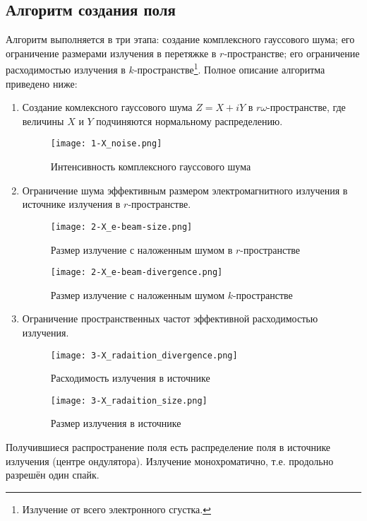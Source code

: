 \subsection{Алгоритм создания поля}
Алгоритм выполняется в три этапа: создание комплексного гауссового шума; его ограничение размерами излучения в перетяжке в $r$-пространстве; его ограничение расходимостью излучения в $k$-пространстве\footnote{Излучение от всего электронного сгустка.}. Полное описание алгоритма приведено ниже: 
\begin{enumerate}
\item \label{noise} Создание комлексного гауссового шума $Z = X + iY$ в $r\omega$-пространстве, где величины $X$ и $Y$ подчиняются нормальному распределению.
\begin{figure}[H] 
	\centering 	\texttt{[image: 1-X\_noise.png]}
	\caption{Интенсивность комплексного гауссового шума}
	\label{fig:1-noise}
\end{figure}
\item \label{beam_s} Ограничение шума эффективным размером электромагнитного излучения в источнике излучения в \textit{$r$}-пространстве.
\begin{figure}[H]
	\centering
	\begin{minipage}{0.45\textwidth}
		\centering
		\texttt{[image: 2-X\_e-beam-size.png]}
		\caption{Размер излучение с наложенным шумом в $r$-пространстве}
		\label{fig:2-beam_size_k}
	\end{minipage}
	\begin{minipage}{0.45\textwidth}
		\centering
		\texttt{[image: 2-X\_e-beam-divergence.png]}
		\caption{Размер излучение с наложенным шумом $k$-пространстве}
		\label{fig:2-beam_size_s}
	\end{minipage}\hfill
\end{figure}
\item \label{beam_k} Ограничение пространственных частот эффективной расходимостью излучения.
\begin{figure}[H]
	\centering
	\begin{minipage}{0.45\textwidth}
		\centering
		\texttt{[image: 3-X\_radaition\_divergence.png]}
		\caption{Расходимость излучения в источнике}
		\label{fig:3-beam_s}
	\end{minipage}
	\begin{minipage}{0.45\textwidth}
		\centering
		\texttt{[image: 3-X\_radaition\_size.png]}
		\caption{Размер излучения в источнике}
		\label{fig:3-beam_k}
	\end{minipage}
\end{figure}
\end{enumerate}
\noindent Получившиеся распространение поля есть распределение поля в источнике излучения (центре ондулятора). Излучение монохроматично, т.е. продольно разрешён один спайк.

